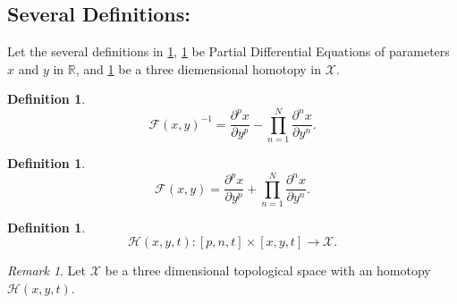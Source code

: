 \documentclass[10pt]{article}
\theoremstyle{plain}
\theoremstyle{definition}
\newtheorem{definition}[theorem]{Definition}
\theoremstyle{remark}
\newtheorem{remark}[theorem]{Remark}
\begin{document}
\subsection{Several Definitions:}

Let the several definitions in \ref{def:1}, \ref{def:2} be Partial Differential Equations of parameters $x$ and $y$ in $\mathbb{R}$, and \ref{def:3} be a three diemensional homotopy in $\mathcal{X}$.

\begin{definition}
\label{def:1}
\begin{equation}
	\mathcal{F}(x, y)^{-1} = \frac{\partial^p x}{ \partial y^p} - \prod_{n=1}^{N} \frac{\partial^n x}{ \partial y^n}. 
\end{equation}
\end{definition}

\begin{definition}
\label{def:2}
\begin{equation}
	\mathcal{F}(x, y) = \frac{\partial^p x}{ \partial y^p} + \prod_{n=1}^{N} \frac{\partial^n x}{ \partial y^n}. 
\end{equation}
\end{definition}

\begin{definition}
\label{def:3}
\begin{equation}
	\mathcal{H}(x, y, t) : [p, n, t] \times [x, y, t] \to \mathcal{X}.
\end{equation}
\end{definition}

\begin{remark}
\label{rem:3.1}
	Let $\mathcal{X}$ be a three dimensional topological space with an homotopy $\mathcal{H}(x, y, t)$.
\end{remark}

\end{document}
